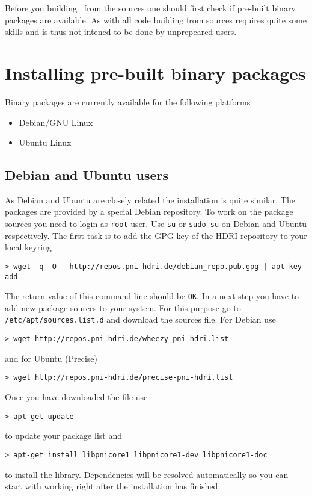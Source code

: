 
Before you building \libpnicore\ from the sources one should first check if
pre-built binary packages are available. As with all code building from sources
requires quite some skills and is thus not intened to be done by unprepeared
users.

\section{Installing pre-built binary packages}

Binary packages are currently available for the following platforms 
\begin{itemize}
\item Debian/GNU Linux 
\item Ubuntu Linux 
\end{itemize}

\subsection{Debian and Ubuntu users}

As Debian and Ubuntu are closely related the installation is quite similar. 
The packages are provided by a special Debian repository. To work on the package
sources you need to login as {\tt root} user. Use {\tt su} or {\tt sudo su} on
Debian and Ubuntu respectively. 
The first task is to add the GPG key of the HDRI repository to your local
keyring
\begin{verbatim}
> wget -q -O - http://repos.pni-hdri.de/debian_repo.pub.gpg | apt-key add -
\end{verbatim}
The return value of this command line should be {\tt OK}.
In a next step you have to add new package sources to your system. For this
purpose go to {\tt /etc/apt/sources.list.d} and download the sources file. 
For Debian use
\begin{verbatim}
> wget http://repos.pni-hdri.de/wheezy-pni-hdri.list
\end{verbatim}
and for Ubuntu (Precise) 
\begin{verbatim}
> wget http://repos.pni-hdri.de/precise-pni-hdri.list
\end{verbatim}
Once you have downloaded the file use 
\begin{verbatim}
> apt-get update
\end{verbatim}
to update your package list and 
\begin{verbatim}
> apt-get install libpnicore1 libpnicore1-dev libpnicore1-doc
\end{verbatim}
to install the library. Dependencies will be resolved automatically so you can
start with working right after the installation has finished.


